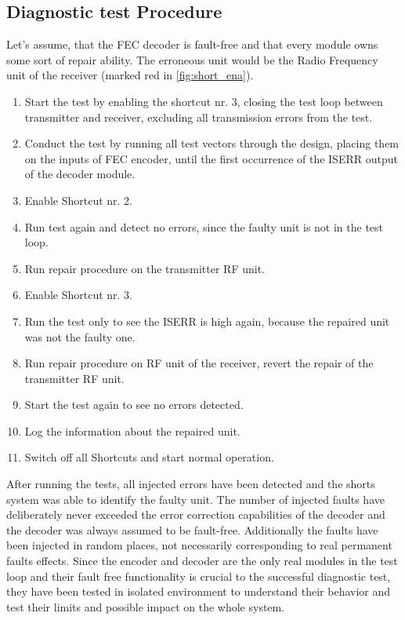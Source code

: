 \subsection{Diagnostic test Procedure}
Let's assume, that the FEC decoder is fault-free and that every module owns some sort of repair ability. The erroneous unit would be the Radio Frequency unit of the receiver (marked red in \autoref{fig:short_ena}).
\begin{enumerate}
    \item Start the test by enabling the shortcut nr. 3, closing the test loop between transmitter and receiver, excluding all transmission errors from the test.
    \item Conduct the test by running all test vectors through the design, placing them on the inputs of FEC encoder, until the first occurrence of the ISERR output of the decoder module.
    \item Enable Shortcut nr. 2.
    \item Run test again and detect no errors, since the faulty unit is not in the test loop.
    \item Run repair procedure on the transmitter RF unit.
    \item Enable Shortcut nr. 3.
    \item Run the test only to see the ISERR is high again, because the repaired unit was not the faulty one.
    \item Run repair procedure on RF unit of the receiver, revert the repair of the transmitter RF unit.
    \item Start the test again to see no errors detected.
    \item Log the information about the repaired unit.
    \item Switch off all Shortcuts and start normal operation.
\end{enumerate}

After running the tests, all injected errors have been detected and the shorts system was able to identify the faulty unit. The number of injected faults have deliberately never exceeded the error correction capabilities of the decoder and the decoder was always assumed to be fault-free. Additionally the faults have been injected in random places, not necessarily corresponding to real permanent faults effects. Since the encoder and decoder are the only real modules in the test loop and their fault free functionality is crucial to the successful diagnostic test, they have been tested in isolated environment to understand their behavior and test their limits and possible impact on the whole system.
